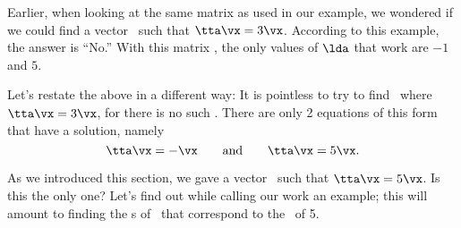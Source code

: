 \medskip

Earlier, when looking at the same matrix as used in our example, we wondered if we could find a vector \vx\ such that $\tta\vx=3\vx$. According to this example, the answer is ``No.'' With this matrix \tta, the only values of $\lda$ that work are $-1$ and $5$.

Let's restate the above in a different way: It is pointless to try to find \vx\ where $\tta\vx=3\vx$, for there is no such \vx. There are only 2 equations of this form that have a solution, namely 
\[
\tta\vx = -\vx \quad\quad \text{and} \quad \quad \tta\vx=5\vx.
\]

As we introduced this section, we gave a vector \vx\ such that $\tta\vx = 5\vx$. Is this the only one? Let's find out while calling our work an example; this will amount to finding the \ev s of \tta\ that correspond to the \ev\ of 5.

\medskip

